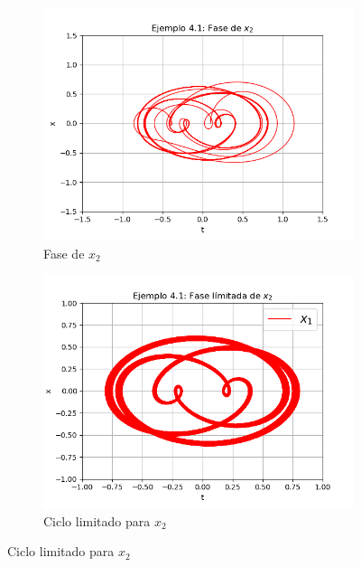 \documentclass[a4paper]{article}
\begin{document}
\begin{center}
\begin{figure}[ht!]
\begin{subfigure}{0.6\textwidth}
  \includegraphics[width=\linewidth]{ejemplo_4_1_5.png}
  \caption{Fase de $x_2$}
\end{subfigure}
\begin{subfigure}{0.6\textwidth}
  \centering
  \includegraphics[width=\linewidth]{ejemplo_4_2_2.png}
  \caption{Ciclo limitado para $x_2$}
\end{subfigure}
\end{figure}
\begin{figure}[ht!]
\begin{subfigure}{0.6\textwidth}
  \centering

\end{subfigure}
\end{figure}
\end{center}
\end{document}
